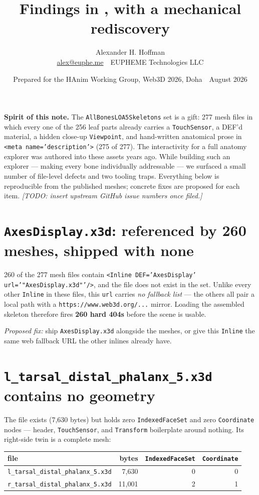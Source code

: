 \documentclass[10pt]{article}
\title{\vspace{-1.4em}\textbf{Findings in \code{AllBonesLOA5Skeletons}, with a mechanical rediscovery}\vspace{-0.4em}}
\author{Alexander H. Hoffman\\\normalsize \href{mailto:alex@euphe.me}{alex@euphe.me} \,\textperiodcentered\, EUPHEME Technologies LLC}
\date{\normalsize Prepared for the HAnim Working Group, Web3D 2026, Doha \,\textperiodcentered\, August 2026}
\newcommand{\code}[1]{\texttt{#1}}
\begin{document}
\maketitle
\vspace{-1.6em}

\noindent\textbf{Spirit of this note.} The \code{AllBonesLOA5Skeletons} set is a gift: 277
mesh files in which every one of the 256 leaf parts already carries a \code{TouchSensor},
a DEF'd material, a hidden close-up \code{Viewpoint}, and hand-written anatomical prose in
\code{<meta name='description'>} (275 of 277). The interactivity for a full anatomy explorer
was authored into these assets years ago. While building such an explorer --- making every
bone individually addressable --- we surfaced a small number of file-level defects and two
tooling traps. Everything below is reproducible from the published meshes; concrete fixes
are proposed for each item. \textit{[TODO: insert upstream GitHub issue numbers once filed.]}

\section{\code{AxesDisplay.x3d}: referenced by 260 meshes, shipped with none}
260 of the 277 mesh files contain
\code{<Inline DEF='AxesDisplay' url='"AxesDisplay.x3d"'/>}, and the file does not exist in
the set. Unlike every other \code{Inline} in these files, this \code{url} carries
\emph{no fallback list} --- the others all pair a local path with a
\code{https://www.web3d.org/...} mirror. Loading the assembled skeleton therefore fires
\textbf{260 hard 404s} before the scene is usable.

\emph{Proposed fix:} ship \code{AxesDisplay.x3d} alongside the meshes, or give this
\code{Inline} the same web fallback URL the other inlines already have.

\section{\code{l\_tarsal\_distal\_phalanx\_5.x3d} contains no geometry}
The file exists (7{,}630 bytes) but holds zero \code{IndexedFaceSet} and zero
\code{Coordinate} nodes --- header, \code{TouchSensor}, and \code{Transform} boilerplate
around nothing. Its right-side twin is a complete mesh:

\begin{center}\small
\begin{tabular}{@{}lrrr@{}}
\toprule
file & bytes & \code{IndexedFaceSet} & \code{Coordinate}\\
\midrule
\code{l\_tarsal\_distal\_phalanx\_5.x3d} & 7{,}630 & 0 & 0\\
\code{r\_tarsal\_distal\_phalanx\_5.x3d} & 11{,}001 & 2 & 1\\
\bottomrule
\end{tabular}
\end{center}
\end{document}
